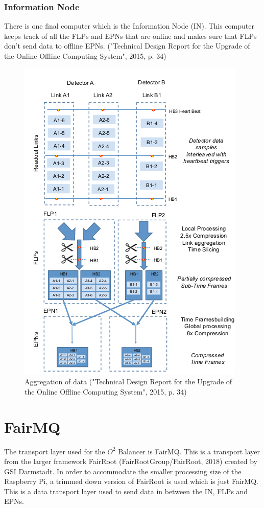 \subsubsection*{Information Node}
There is one final computer which is the Information Node (IN). This computer keeps track of all the FLPs and EPNs that are online and makes sure that FLPs don't send data to offline EPNs. ("Technical Design Report for the Upgrade of the Online Offline Computing System", 2015, p. 34)

\begin{figure}
	\centering
	\includegraphics[scale=1]{./graphics/data_aggregation.png}
	\caption{Aggregation of data ("Technical Design Report for the Upgrade of the Online Offline Computing System", 2015, p. 34)}
\end{figure}

\section{FairMQ}
The transport layer used for the $O^2$ Balancer is FairMQ. This is a transport layer from the larger framework FairRoot (FairRootGroup/FairRoot, 2018) created by GSI Darmstadt. In order to accommodate the smaller processing size of the Raspberry Pi, a trimmed down version of FairRoot is used which is just FairMQ. This is a data transport layer used to send data in between the IN, FLPs and EPNs. 
